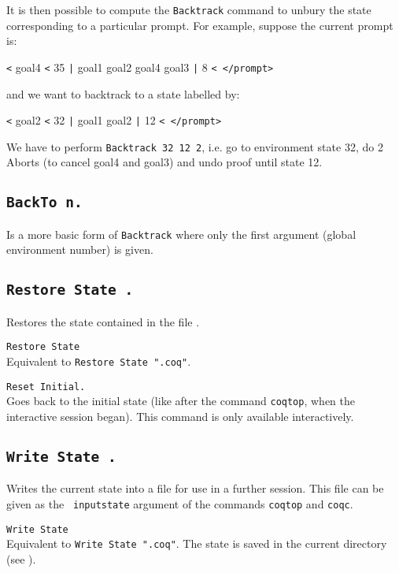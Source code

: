 It is then possible to compute the \texttt{Backtrack} command to
unbury the state corresponding to a particular prompt. For example,
suppose the current prompt is:

\verb!<! goal4 \verb!<! 35
\verb!|! goal1 goal2 goal4 goal3 
\verb!|! 8 \verb!< </prompt>!

and we want to backtrack to a state labelled by:

\verb!<! goal2 \verb!<! 32
\verb!|! goal1 goal2
\verb!|! 12 \verb!< </prompt>!

We have to perform \verb!Backtrack 32 12 2!, i.e. go to environment
state 32, do 2 Aborts (to cancel goal4 and goal3) and undo proof until
state 12.

\subsection[\tt BackTo.]{\tt BackTo n.}
Is a more basic form of \texttt{Backtrack} where only the first
argument (global environment number) is given.

\subsection[\tt Restore State \str.]{\tt Restore State \str.}
  Restores the state contained in the file \str.

\begin{Variants}
\item {\tt Restore State \ident}\\
 Equivalent to {\tt Restore State "}{\ident}{\tt .coq"}.
\item {\tt Reset Initial.}\\ 
  Goes back to the initial state (like after the command {\tt coqtop},
  when the interactive session began). This command is only available
  interactively.
\end{Variants}

\subsection[\tt Write State \str.]{\tt Write State \str.}
Writes the current state into a file \str{} for
use in a further session. This file can be given as the {\tt
  inputstate} argument of the commands {\tt coqtop} and {\tt coqc}.

\begin{Variants}
\item {\tt Write State \ident}\\
 Equivalent to {\tt Write State "}{\ident}{\tt .coq"}.
 The state is saved in the current directory (see \pageref{Pwd}).
\end{Variants}

